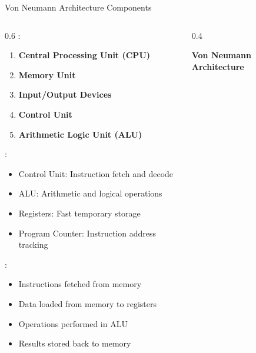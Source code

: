 \begin{frame}{Von Neumann Architecture Components}
\begin{columns}
\begin{column}{0.6\textwidth}
:
\begin{enumerate}
\item \textbf{Central Processing Unit (CPU)}
\item \textbf{Memory Unit}
\item \textbf{Input/Output Devices}
\item \textbf{Control Unit}
\item \textbf{Arithmetic Logic Unit (ALU)}
\end{enumerate}

\vspace{0.3cm}
:
\begin{itemize}
\item Control Unit: Instruction fetch and decode
\item ALU: Arithmetic and logical operations
\item Registers: Fast temporary storage
\item Program Counter: Instruction address tracking
\end{itemize}

\vspace{0.3cm}
:
\begin{itemize}
\item Instructions fetched from memory
\item Data loaded from memory to registers
\item Operations performed in ALU
\item Results stored back to memory
\end{itemize}
\end{column}
\begin{column}{0.4\textwidth}
\begin{center}
\textbf{Von Neumann Architecture}
\vspace{0.3cm}

\end{center}
\end{column}
\end{columns}
\end{frame}

